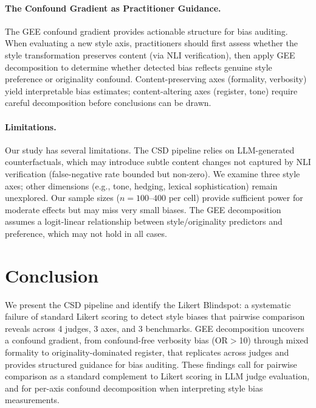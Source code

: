 \documentclass[10pt,twocolumn]{article}
\begin{document}
\paragraph{The Confound Gradient as Practitioner Guidance.}
The GEE confound gradient provides actionable structure for bias auditing.
When evaluating a new style axis, practitioners should first assess whether the style transformation preserves content (via NLI verification), then apply GEE decomposition to determine whether detected bias reflects genuine style preference or originality confound.
Content-preserving axes (formality, verbosity) yield interpretable bias estimates; content-altering axes (register, tone) require careful decomposition before conclusions can be drawn.

\paragraph{Limitations.}
Our study has several limitations.
The CSD pipeline relies on LLM-generated counterfactuals, which may introduce subtle content changes not captured by NLI verification (false-negative rate bounded but non-zero).
We examine three style axes; other dimensions (e.g., tone, hedging, lexical sophistication) remain unexplored.
Our sample sizes ($n=100$--$400$ per cell) provide sufficient power for moderate effects but may miss very small biases.
The GEE decomposition assumes a logit-linear relationship between style/originality predictors and preference, which may not hold in all cases.

\section{Conclusion}

We present the CSD pipeline and identify the Likert Blindspot: a systematic failure of standard Likert scoring to detect style biases that pairwise comparison reveals across 4 judges, 3 axes, and 3 benchmarks.
GEE decomposition uncovers a confound gradient, from confound-free verbosity bias (OR$>$10) through mixed formality to originality-dominated register, that replicates across judges and provides structured guidance for bias auditing.
These findings call for pairwise comparison as a standard complement to Likert scoring in LLM judge evaluation, and for per-axis confound decomposition when interpreting style bias measurements.
\end{document}
